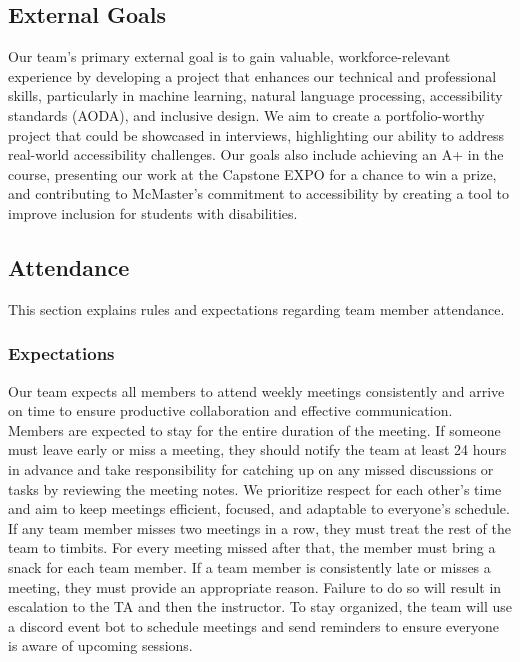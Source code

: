 \documentclass{article}
\begin{document}

\subsection*{External Goals}

Our team’s primary external goal is to gain valuable, workforce-relevant experience by 
developing a project that enhances our technical and professional skills, particularly 
in machine learning, natural language processing, accessibility standards (AODA), and inclusive design. We aim
to create a portfolio-worthy project that could be showcased in interviews, 
highlighting our ability to address real-world accessibility challenges. Our goals also 
include achieving an A+ in the course, presenting our work at the Capstone EXPO for a chance 
to win a prize, and contributing to McMaster's commitment to accessibility by creating a tool to 
improve inclusion for students with disabilities.  

\subsection*{Attendance}
This section explains rules and expectations regarding team member attendance.

\subsubsection*{Expectations}

Our team expects all members to attend weekly meetings consistently and arrive 
on time to ensure productive collaboration and effective communication. Members 
are expected to stay for the entire duration of the meeting. If someone must 
leave early or miss a meeting, they should notify the team at least 24 hours 
in advance and take responsibility for catching up on any missed discussions 
or tasks by reviewing the meeting notes. We prioritize respect for each other’s time and aim to keep meetings efficient, 
focused, and adaptable to everyone’s schedule. If any team member misses two 
meetings in a row, they must treat the rest of the team to timbits. For every 
meeting missed after that, the member must bring a snack for each team member.
If a team member is consistently late or misses a meeting, they must provide an 
appropriate reason. Failure to do so will result in escalation to the TA and 
then the instructor. To stay organized, the team will use a discord event bot to 
schedule meetings and send reminders to ensure everyone is aware of upcoming 
sessions. 
\end{document}
